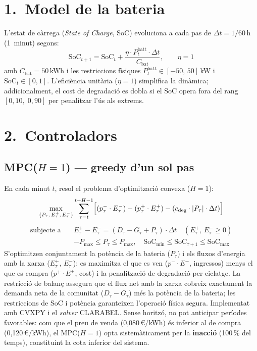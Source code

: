 \documentclass[a4paper,11pt]{article}
\begin{document}
\section*{1.\ Model de la bateria}

L'estat de càrrega (\emph{State of Charge}, SoC) evoluciona a cada pas
de $\Delta t = 1/60$\,h (1~minut) segons:
\begin{equation}
  \mathrm{SoC}_{t+1} = \mathrm{SoC}_t
  + \frac{\eta \cdot P_t^{\mathrm{batt}} \cdot \Delta t}{C_{\mathrm{bat}}},
  \qquad \eta = 1
  \label{eq:batt}
\end{equation}
amb $C_{\mathrm{bat}}=50$\,kWh i les restriccions físiques
$P_t^{\mathrm{batt}}\in[-50,\,50]$\,kW i $\mathrm{SoC}_t\in[0,1]$.
L'eficiència unitària ($\eta=1$) simplifica la dinàmica; addicionalment,
el cost de degradació es dobla si el SoC opera fora del rang
$[0{,}10,\;0{,}90]$ per penalitzar l'ús als extrems.

\section*{2.\ Controladors}

\subsection*{MPC($H=1$) — greedy d'un sol pas}

En cada minut $t$, resol el problema d'optimització convexa ($H=1$):
\begin{equation}
  \max_{\{P_\tau,\,E^+_\tau,\,E^-_\tau\}}
  \sum_{\tau=t}^{t+H-1}
  \Bigl[(p^-_\tau \cdot E^-_\tau) - (p^+_\tau \cdot E^+_\tau)
        - (c_{\mathrm{deg}} \cdot |P_\tau| \cdot \Delta t)\Bigr]
\end{equation}
\begin{align*}
  \text{subjecte a}\quad
  & E^+_\tau - E^-_\tau = (D_\tau - G_\tau + P_\tau) \cdot \Delta t
    \quad (E^+_\tau,\,E^-_\tau \geq 0)\\
  & -P_{\max} \leq P_\tau \leq P_{\max},\quad
    \mathrm{SoC}_{\min} \leq \mathrm{SoC}_{\tau+1} \leq \mathrm{SoC}_{\max}
\end{align*}
S'optimitzen conjuntament la potència de la bateria ($P_\tau$) i els fluxos
d'energia amb la xarxa ($E^+_\tau$, $E^-_\tau$): es maximitza el que es ven
($p^-\cdot E^-$, ingressos) menys el que es compra ($p^+\cdot E^+$, cost) i
la penalització de degradació per ciclatge.
La restricció de balanç assegura que el flux net amb la xarxa cobreix
exactament la demanda neta de la comunitat ($D_\tau - G_\tau$) més la
potència de la bateria; les restriccions de SoC i potència garanteixen
l'operació física segura.
Implementat amb CVXPY i el \textit{solver} CLARABEL.
Sense horitzó, no pot anticipar períodes favorables: com que el preu de
venda (0,080\,€/kWh) és inferior al de compra (0,120\,€/kWh), el MPC($H=1$)
opta sistemàticament per la \textbf{inacció} (100\,\% del temps),
constituint la cota inferior del sistema.
\end{document}

